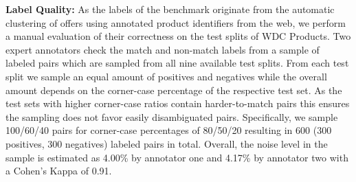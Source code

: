 \documentclass[sigconf,edbt]{acmart-edbt2024}
\begin{document}
\textbf{Label Quality:} As the labels of the benchmark originate from the automatic clustering of offers using annotated product identifiers from the web, we perform a manual evaluation of their correctness on the test splits of WDC Products. Two expert annotators check the match and non-match labels from a sample of labeled pairs which are sampled from all nine available test splits. From each test split we sample an equal amount of positives and negatives while the overall amount depends on the corner-case percentage of the respective test set. As the test sets with higher corner-case ratios contain harder-to-match pairs this ensures the sampling does not favor easily disambiguated pairs. Specifically,  we sample 100/60/40 pairs for corner-case percentages of 80/50/20 resulting in 600 (300 positives, 300 negatives) labeled pairs in total. Overall, the noise level in the sample is estimated as 4.00\% by annotator one and 4.17\% by annotator two with a Cohen's Kappa of 0.91.
\end{document}
